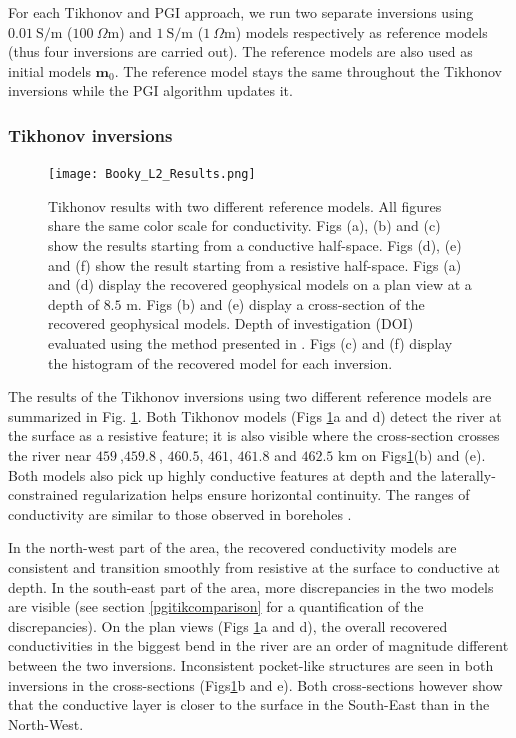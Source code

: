 \documentclass[extra]{gji} %
\begin{document}
For each Tikhonov and PGI approach, we run two separate inversions using $0.01~\text{S/m}$ ($100~\Omega \text{m}$) and $1~\text{S/m}$ ($1~\Omega \text{m}$) models respectively as reference models (thus four inversions are carried out). The reference models are also used as initial models $\mathbf{m}_0$. The reference model stays the same throughout the Tikhonov inversions while the PGI algorithm updates it.

\subsubsection{Tikhonov inversions}

\begin{figure}
\centering
\texttt{[image: Booky\_L2\_Results.png]}
\caption{Tikhonov results with two different reference models. All figures share the same color scale for conductivity. Figs (a), (b) and (c) show the results starting from a conductive half-space. Figs (d), (e) and (f) show the result starting from a resistive half-space. Figs (a) and (d) display the recovered geophysical models on a plan view at a depth of $8.5$ m. Figs (b) and (e) display a cross-section of the recovered geophysical models. Depth of investigation (DOI) evaluated using the method presented in \cite{DOI}. Figs (c) and (f) display the histogram of the recovered model for each inversion.}
\label{fig:Book_L2_Results}
\end{figure}

The results of the Tikhonov inversions using two different reference models are summarized in Fig. \ref{fig:Book_L2_Results}. Both Tikhonov models (Figs \ref{fig:Book_L2_Results}a and d) detect the river at the surface as a resistive feature; it is also visible where the cross-section crosses the river near $459~$,$459.8~$, $460.5$, $461$, $461.8$ and $462.5$ km on Figs\ref{fig:Book_L2_Results}(b) and (e). Both models also pick up highly conductive features at depth and the laterally-constrained regularization helps ensure horizontal continuity. The ranges of conductivity are similar to those observed in boreholes \citep{BookyExperiment}.

In the north-west part of the area, the recovered conductivity models are consistent and transition smoothly from resistive at the surface to conductive at depth. In the south-east part of the area, more discrepancies in the two models are visible (see section \ref{pgitikcomparison} for a quantification of the discrepancies). On the plan views (Figs \ref{fig:Book_L2_Results}a and d), the overall recovered conductivities in the biggest bend in the river are an order of magnitude different between the two inversions. Inconsistent pocket-like structures are seen in both inversions in the cross-sections (Figs\ref{fig:Book_L2_Results}b and e). Both cross-sections however show that the conductive layer is closer to the surface in the South-East than in the North-West.
\end{document}
